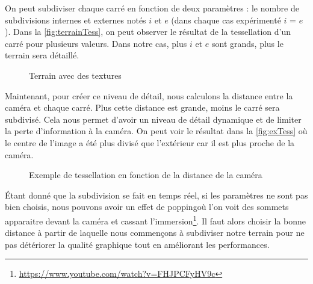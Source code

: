 On peut subdiviser chaque carré en fonction de deux paramètres : le nombre de subdivisions internes et externes notés $i$ et $e$ (dans chaque cas expérimenté $i$ = $e$). Dans la \autoref{fig:terrainTess}, on peut observer le résultat de la tessellation d'un carré pour plusieurs valeurs. Dans notre cas, plus $i$ et $e$ sont grands, plus le terrain sera détaillé.
\begin{figure}[H]			
	\caption{Terrain avec des textures}
	\label{fig:terrainTess}
\end{figure}

Maintenant, pour créer ce niveau de détail, nous calculons la distance entre la caméra et chaque carré. Plus cette distance est grande, moins le carré sera subdivisé. Cela nous permet d'avoir un niveau de détail dynamique et de limiter la perte d'information à la caméra. On peut voir le résultat dans la \autoref{fig:exTess} où le centre de l'image a été plus divisé que l'extérieur car il est plus proche de la caméra.

\begin{figure}[H]			
	\caption{Exemple de tessellation en fonction de la distance de la caméra}
	\label{fig:exTess}
\end{figure}

Étant donné que la subdivision se fait en temps réel, si les paramètres ne sont pas bien choisis, nous pouvons avoir un effet de \og popping\fg où l'on voit des sommets apparaitre devant la caméra et cassant l'immersion\footnote{\url{https://www.youtube.com/watch?v=FHJPCFyHV9c}}. Il faut alors choisir la bonne distance à partir de laquelle nous commençons à subdiviser notre terrain pour ne pas détériorer la qualité graphique tout en améliorant les performances.

